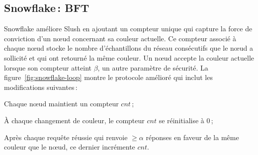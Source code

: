 \documentclass[letterpaper,twocolumn,10pt]{article}
\theoremstyle{definition}
\begin{document}
\subsection{Snowflake\,: BFT}

Snowflake améliore Slush en ajoutant un compteur unique qui capture la force de conviction d'un nœud concernant sa couleur
actuelle. Ce compteur associé à chaque nœud stocke le nombre d'échantillons du réseau consécutifs que le nœud a
sollicité et qui ont retourné la même couleur. Un nœud accepte la couleur actuelle lorsque son compteur atteint $\beta$,
un autre paramètre de sécurité. La figure~\ref{fig:snowflake-loop} montre le protocole amélioré qui inclut les
modifications suivantes\,:


\begin{compactenum}
	\item Chaque nœud maintient un compteur $\mathit{cnt}$\,;
    \item À chaque changement de couleur, le compteur $\mathit{cnt}$ se réinitialise à 0\,;
    \item Après chaque requête réussie qui renvoie $\ge \alpha$ réponses en faveur de la même couleur que le nœud,
      ce dernier incrémente $\mathit{cnt}$.
\end{compactenum}

\end{document}
